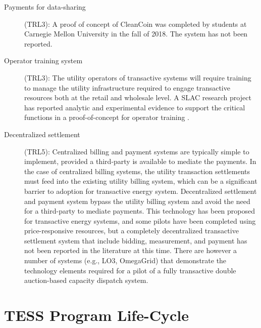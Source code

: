 \begin{description}
    \item[Payments for data-sharing] (TRL3): A proof of concept of CleanCoin was completed by students at Carnegie Mellon University in the fall of 2018. The system has not been reported.

    \item[Operator training system] (TRL3): The utility operators of transactive systems will require training to manage the utility infrastructure required to engage transactive resources both at the retail and wholesale level.  A SLAC research project has reported analytic and experimental evidence to support the critical functions in a proof-of-concept for operator training \cite{hu2019}. 

    \item[Decentralized settlement] (TRL5): Centralized billing and payment systems are typically simple to implement, provided a third-party is available to mediate the payments.  In the case of centralized billing systems, the utility transaction settlements must feed into the existing utility billing system, which can be a significant barrier to adoption for transactive energy system.  Decentralized settlement and payment system bypass the utility billing system and avoid the need for a third-party to mediate payments. This technology has been proposed for transactive energy systems, and some pilots have been completed using price-responsive resources, but a completely decentralized transactive settlement system that include bidding, measurement, and payment has not been reported in the literature at this time. There are however a number of systems (e.g., LO3, OmegaGrid) that demonstrate the technology elements required for a pilot of a fully transactive double auction-based capacity dispatch system.

\end{description}

\section{TESS Program Life-Cycle}

